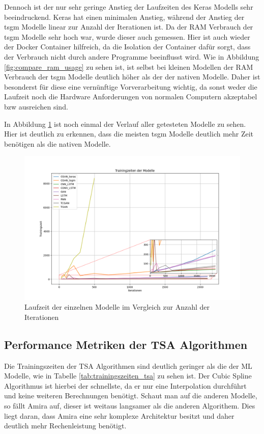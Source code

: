 Dennoch ist der nur sehr geringe Anstieg der Laufzeiten des Keras Modells sehr beeindruckend. Keras hat einen minimalen Anstieg, während der Anstieg der tsgm Modelle linear zur Anzahl der Iterationen ist.
Da der \ac{RAM} Verbrauch der tsgm Modelle sehr hoch war, wurde dieser auch gemessen. Hier ist auch wieder der Docker Container hilfreich, da die Isolation der Container dafür sorgt, dass der Verbrauch nicht durch andere Programme beeinflusst wird.
Wie in Abbildung \ref{fig:compare_ram_usage} zu sehen ist, ist selbst bei kleinen Modellen der \ac{RAM} Verbrauch der tsgm Modelle deutlich höher als der der nativen Modelle. Daher ist besonderst für diese eine vernünftige Vorverarbeitung wichtig,
da sonst weder die Laufzeit noch die Hardware Anforderungen von normalen Computern akzeptabel bzw ausreichen sind.


In Abbildung \ref{fig:train_time_compared} ist noch einmal der Verlauf aller getesteten Modelle zu sehen. Hier ist deutlich zu erkennen, dass die meisten tsgm Modelle deutlich mehr Zeit benötigen als die nativen Modelle.
\begin{figure}[ht]
    \centering
    \includegraphics[width=1\textwidth]{includes/figures/graphs/train_time_compared.png}
    \caption{Laufzeit der einzelnen Modelle im Vergleich zur Anzahl der Iterationen}
    \label{fig:train_time_compared}
\end{figure}



\subsection{Performance Metriken der TSA Algorithmen}
Die Trainingszeiten der \ac{TSA} Algorithmen sind deutlich geringer als die der \ac{ML} Modelle, wie in Tabelle \ref{tab:trainingszeiten_tsa} zu sehen ist.
Der Cubic Spline Algorithmus ist hierbei der schnellste, da er nur eine Interpolation durchführt und keine weiteren Berechnungen benötigt.
Schaut man auf die anderen Modelle, so fällt Amira auf, dieser ist weitaus langsamer als die anderen Algorithem.
Dies liegt daran, dass Amira eine sehr komplexe Architektur besitzt und daher deutlich mehr Rechenleistung benötigt.

